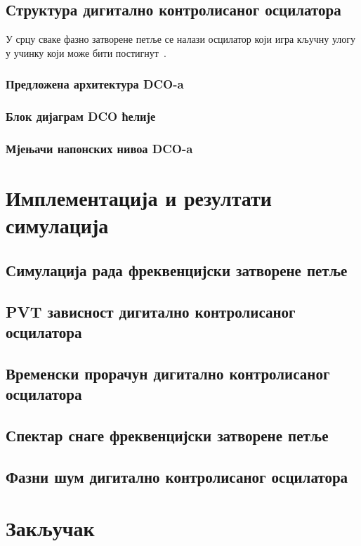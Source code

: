 \documentclass[master]{finthesis}
\begin{document}

\subsection{Структура дигитално контролисаног осцилатора} \label{DCO structure}
У срцу сваке фазно затворене петље се налази осцилатор који игра кључну улогу у учинку који може бити постигнут~\cite{Razavi:PLL_CMOS_2020}.

\subsubsection{Предложена архитектура DCO-a}

\subsubsection{Блок дијаграм DCO ћелије}

\subsubsection{Мјењачи напонских нивоа DCO-a}


\section{Имплементација и резултати симулација} \label{Implementation and results}

\subsection{Симулација рада фреквенцијски затворене петље}

\subsection{PVT зависност дигитално контролисаног осцилатора}

\subsection{Временски прорачун дигитално контролисаног осцилатора}

\subsection{Спектар снаге фреквенцијски затворене петље}

\subsection{Фазни шум дигитално контролисаног осцилатора}


\section{Закључак} \label{Conclusion}


\makebibliography
\end{document}
